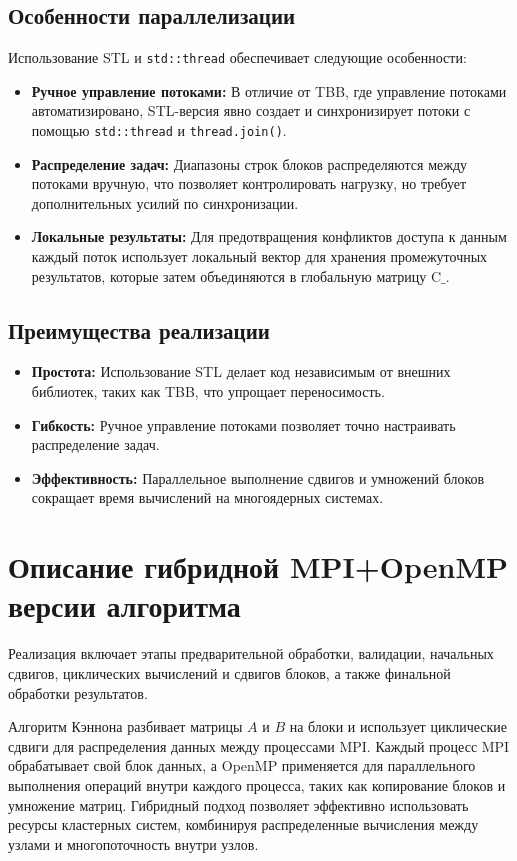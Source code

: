\documentclass[a4paper,12pt]{article}
\begin{document}
\subsection{Особенности параллелизации}
Использование STL и \texttt{std::thread} обеспечивает следующие особенности:
\begin{itemize}
    \item \textbf{Ручное управление потоками:} В отличие от TBB, где управление потоками автоматизировано, STL-версия явно создает и синхронизирует потоки с помощью \texttt{std::thread} и \texttt{thread.join()}.
    \item \textbf{Распределение задач:} Диапазоны строк блоков распределяются между потоками вручную, что позволяет контролировать нагрузку, но требует дополнительных усилий по синхронизации.
    \item \textbf{Локальные результаты:} Для предотвращения конфликтов доступа к данным каждый поток использует локальный вектор для хранения промежуточных результатов, которые затем объединяются в глобальную матрицу \( \text{C\_} \).
\end{itemize}

\subsection{Преимущества реализации}
\begin{itemize}
    \item \textbf{Простота:} Использование STL делает код независимым от внешних библиотек, таких как TBB, что упрощает переносимость.
    \item \textbf{Гибкость:} Ручное управление потоками позволяет точно настраивать распределение задач.
    \item \textbf{Эффективность:} Параллельное выполнение сдвигов и умножений блоков сокращает время вычислений на многоядерных системах.
\end{itemize}

\section{Описание гибридной MPI+OpenMP версии алгоритма}
Реализация включает этапы предварительной обработки, валидации, начальных сдвигов, циклических вычислений и сдвигов блоков, а также финальной обработки результатов.

Алгоритм Кэннона разбивает матрицы \( A \) и \( B \) на блоки и использует циклические сдвиги для распределения данных между процессами MPI. Каждый процесс MPI обрабатывает свой блок данных, а OpenMP применяется для параллельного выполнения операций внутри каждого процесса, таких как копирование блоков и умножение матриц. Гибридный подход позволяет эффективно использовать ресурсы кластерных систем, комбинируя распределенные вычисления между узлами и многопоточность внутри узлов.
\end{document}
